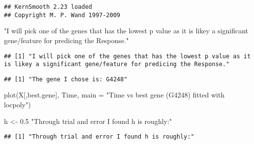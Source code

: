 \documentclass[
]{article}
\newenvironment{Shaded}{\begin{snugshade}}{\end{snugshade}}
\newcommand{\AttributeTok}[1]{\textcolor[rgb]{0.77,0.63,0.00}{#1}}
\newcommand{\DecValTok}[1]{\textcolor[rgb]{0.00,0.00,0.81}{#1}}
\newcommand{\FloatTok}[1]{\textcolor[rgb]{0.00,0.00,0.81}{#1}}
\newcommand{\FunctionTok}[1]{\textcolor[rgb]{0.00,0.00,0.00}{#1}}
\newcommand{\NormalTok}[1]{#1}
\newcommand{\OtherTok}[1]{\textcolor[rgb]{0.56,0.35,0.01}{#1}}
\newcommand{\SpecialCharTok}[1]{\textcolor[rgb]{0.00,0.00,0.00}{#1}}
\newcommand{\StringTok}[1]{\textcolor[rgb]{0.31,0.60,0.02}{#1}}
\begin{document}
\begin{verbatim}
## KernSmooth 2.23 loaded
## Copyright M. P. Wand 1997-2009
\end{verbatim}

\begin{Shaded}
\begin{Highlighting}[]
\StringTok{"I will pick one of the genes that has the lowest p value as it is likey a significant gene/feature for predicing the Response."}
\end{Highlighting}
\end{Shaded}

\begin{verbatim}
## [1] "I will pick one of the genes that has the lowest p value as it is likey a significant gene/feature for predicing the Response."
\end{verbatim}

\begin{Shaded}
\end{Shaded}

\begin{verbatim}
## [1] "The gene I chose is: G4248"
\end{verbatim}

\begin{Shaded}
\begin{Highlighting}[]
\FunctionTok{plot}\NormalTok{(X[,best.gene], Time, }\AttributeTok{main =} \StringTok{"Time vs best gene (G4248) fitted with locpoly"}\NormalTok{)}



\NormalTok{h }\OtherTok{\textless{}{-}} \FloatTok{0.5}
\StringTok{"Through trial and error I found h is roughly:"}
\end{Highlighting}
\end{Shaded}

\begin{verbatim}
## [1] "Through trial and error I found h is roughly:"
\end{verbatim}
\end{document}
